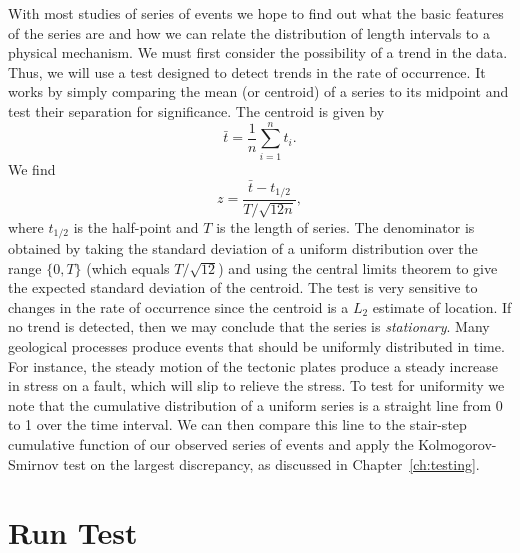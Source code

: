 	With most studies of series of events we hope to find out what the basic features of the series 
are and how we can relate the distribution of length intervals to a physical mechanism.  We must 
first consider the possibility of a trend in the data.   Thus, we will use a test designed to detect 
trends in the rate of occurrence.  It works by simply comparing the mean (or centroid) of a series 
to its midpoint and test their separation for significance.
The centroid is given by
\begin{equation}
\bar{t} = \frac{1}{n} \sum^n_{i=1} t_i.
\end{equation}
We find
\begin{equation}
z = \frac{\bar{t}-t_{1/2}}{T/ \sqrt{12 n}},
\end{equation}
where $t_{1/2}$ is the half-point and $T$ is the length of series.  The denominator is obtained by taking
the standard deviation of a uniform distribution over the range $\{0,T\}$ (which equals $T/\sqrt{12}$) and
using the central limits theorem to give the expected standard deviation of the centroid.
The test is very sensitive to changes in the rate 
of occurrence since the centroid is a $L_2$ estimate of location.   If no trend is detected, then we may 
conclude that the series is \emph{stationary}.
	Many geological processes produce events that should be uniformly distributed in time.  For 
instance, the steady motion of the tectonic plates produce a steady increase in stress on a fault, 
which will slip to relieve the stress.  To test for uniformity we note that the cumulative 
distribution of a uniform series is a straight line from 0 to 1 over the time interval.  We can then 
compare this line to the stair-step cumulative function of our observed series of events and apply 
the Kolmogorov-Smirnov test on the largest discrepancy, as discussed in Chapter~\ref{ch:testing}.

\section{Run Test}

